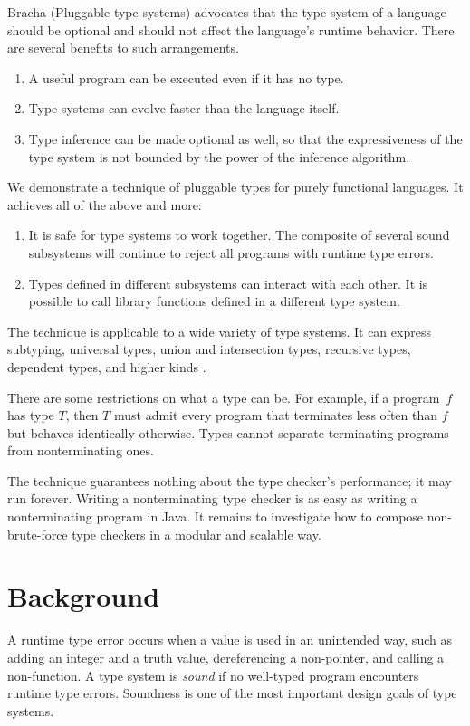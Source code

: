 \documentclass{amsart}
\def\thingsExpressibleInMpsModel{%
subtyping, universal types, union and intersection types,
recursive types, dependent types, and higher kinds%
}
\begin{document}
Bracha (Pluggable type systems) advocates that the type system of
a language should be optional and should not affect the
language's runtime behavior. There are several benefits to such
arrangements.
\begin{enumerate}
\item A useful program can be executed even if it has no type.
\item Type systems can evolve faster than the language itself.
\item Type inference can be made optional as well, so that the
expressiveness of the type system is not bounded by the power of
the inference algorithm.
\end{enumerate}
We demonstrate a technique of pluggable types for purely
functional languages. It achieves all of the above and more:
\begin{enumerate}\setcounter{enumi}3
\item It is safe for type systems to work together. The composite
of several sound subsystems will continue to reject all programs
with runtime type errors.
\item Types defined in different subsystems can interact with
each other. It is possible to call library functions defined
in a different type system.
\end{enumerate}
The technique is applicable to a wide variety of type systems. It
can express \thingsExpressibleInMpsModel.

There are some restrictions on what a type can be. For example,
if a program~$f$ has type $T$, then $T$ must admit every program
that terminates less often than $f$ but behaves identically
otherwise. Types cannot separate terminating programs from
nonterminating ones.

The technique guarantees nothing about the type checker's
performance; it may run forever. Writing a nonterminating type
checker is as easy as writing a nonterminating program in Java.
It remains to investigate how to compose non-brute-force type
checkers in a modular and scalable way.

\section{Background}

A runtime type error occurs when a value is used in an unintended
way, such as adding an integer and a truth value, dereferencing a
non-pointer, and calling a non-function. A type system is
\emph{sound} if no well-typed program encounters runtime type
errors. Soundness is one of the most important design goals of
type systems.
\end{document}
